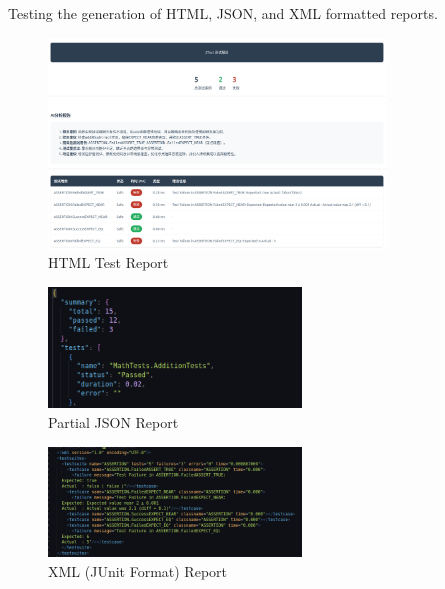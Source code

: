 \documentclass{article}
\begin{document}
Testing the generation of HTML, JSON, and XML formatted reports.
\begin{figure}[H]
    \centering
    \includegraphics[width=0.8\textwidth]{img/html.png}
    \caption{HTML Test Report}
    \label{fig: Data-Driven Function Test}
\end{figure}
\begin{figure}[H]
    \centering
    \includegraphics[width=0.6\textwidth]{img/json.png}
    \caption{Partial JSON Report}
    \label{fig: Data-Driven Function Test}
\end{figure}

\begin{figure}[H]
    \centering
    \includegraphics[width=0.6\textwidth]{img/xml.png}
    \caption{XML (JUnit Format) Report}
    \label{fig: Data-Driven Function Test}
\end{figure}
\end{document}
